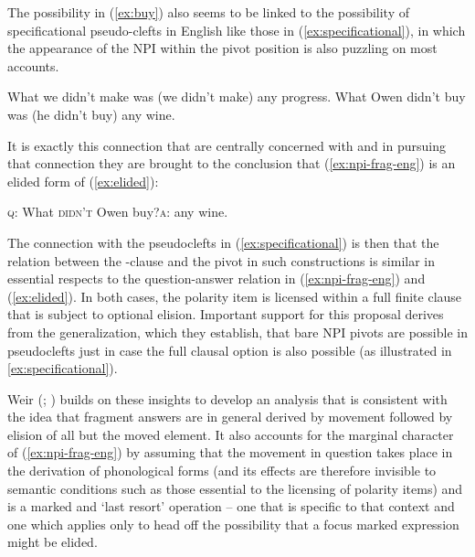 \documentclass[output=paper,colorlinks,citecolor=brown]{langscibook}
\begin{document}

The possibility in (\ref{ex:buy}) also seems to be linked to the possibility of specificational pseudo-clefts in English like those in (\ref{ex:specificational}), in which the appearance of the NPI within the pivot position is also puzzling on most accounts.

\ea\label{ex:specificational}
\ea
What we didn't make was (we didn't make) any progress.
\ex
What Owen didn't buy was (he didn't buy) any wine.
\z
\z


It is exactly this connection that \citet{marcel-et-al:00} are centrally concerned with and in pursuing that connection they are brought to the conclusion that (\ref{ex:npi-frag-eng}) is an elided form of (\ref{ex:elided}): 

\ea\label{ex:elided}
\textsc{q}: What \textsc{didn't} Owen buy?\quad\textsc{a}:  any wine.
\z


The connection with the pseudoclefts in  (\ref{ex:specificational}) is then that the relation between the \WH-clause and the pivot in such constructions is similar in essential respects to the question-answer relation in (\ref{ex:npi-frag-eng}) and (\ref{ex:elided}). In both cases, the polarity item is licensed within a full finite clause that is subject to optional elision. Important support for this proposal derives from the generalization, which they establish, that bare NPI pivots are possible in pseudoclefts just in case the full clausal option is also possible (as illustrated in \ref{ex:specificational}).

Weir (\citeyear{weir-diss}; \citeyear{weir:15}) builds on these insights to develop an analysis that is consistent with the idea that fragment answers are in general derived by movement followed by elision of all but the moved element. It also accounts for the marginal character of (\ref{ex:npi-frag-eng}) by assuming that the movement in question takes place in the derivation of phonological forms (and its effects are therefore invisible to semantic conditions such as those essential to the licensing of polarity items) and is a marked and `last resort' operation -- one that is specific to that context and one which applies only to head off the possibility that a focus marked expression might be elided.
\end{document}
